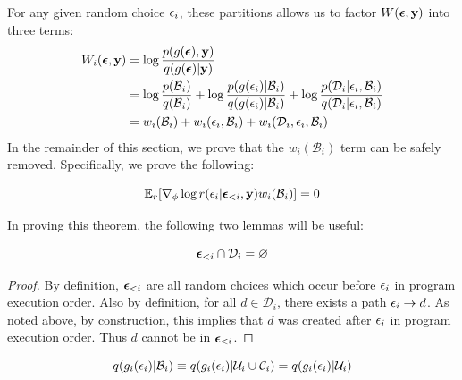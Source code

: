 For any given random choice $\epsilon_i$, these partitions allows us to factor $W(\bm{\epsilon}, \mathbf{y})$ into three terms:
\begin{align*}
W_i(\reparamVars, \observedVars)
%
&= \log \frac{p(\xformedVars, \observedVars)}{\guide(\xformedVars | \observedVars)}\\
%
&= \log \frac{p(\mathcal{B}_i)}{\guide(\mathcal{B}_i)} + \log \frac{p( \reparamXform(\reparamVar_i) | \mathcal{B}_i)}{\guide(\reparamXform(\reparamVar_i) | \mathcal{B}_i)}	+ \log \frac{p(\mathcal{D}_i | \reparamVar_i, \mathcal{B}_i)}{\guide(\mathcal{D}_i | \reparamVar_i, \mathcal{B}_i)}\\
%
&= w_i(\mathcal{B}_i) + w_i(\reparamVar_i, \mathcal{B}_i) + w_i(\mathcal{D}_i, \reparamVar_i, \mathcal{B}_i)
\end{align*}
In the remainder of this section, we prove that the $w_i(\mathcal{B}_i)$ term can be safely removed. Specifically, we prove the following:
\begin{theorem}
\begin{equation*}
\mathbb{E}_{r} [ \nabla_\phi \log r(\epsilon_i | \bm{\epsilon}_{<i}, \mathbf{y}) w_i(\mathcal{B}_i) ] = 0
\end{equation*}
\label{thm:wterms}
\end{theorem}
In proving this theorem, the following two lemmas will be useful:
\begin{lemma}
\begin{equation*}
\bm{\epsilon}_{<i} \cap \mathcal{D}_i = \varnothing
\end{equation*}
\label{lem:depsDisjoint}
\end{lemma}
%
\begin{proof}
By definition, $\bm{\epsilon}_{<i}$ are all random choices which occur before $\epsilon_i$ in program execution order. Also by definition, for all $d \in \mathcal{D}_i$, there exists a path $\epsilon_i \to d$. As noted above, by construction, this implies that $d$ was created after $\epsilon_i$ in program execution order. Thus $d$ cannot be in $\bm{\epsilon}_{<i}$.
\end{proof}
\begin{lemma}
\begin{equation*}
q(g_i(\epsilon_i) | \mathcal{B}_i) \equiv q(g_i(\epsilon_i) | \mathcal{U}_i \cup \mathcal{C}_i) = q(g_i(\epsilon_i) | \mathcal{U}_i)
\end{equation*}
\label{lem:bIndependentFromU}
\end{lemma}
